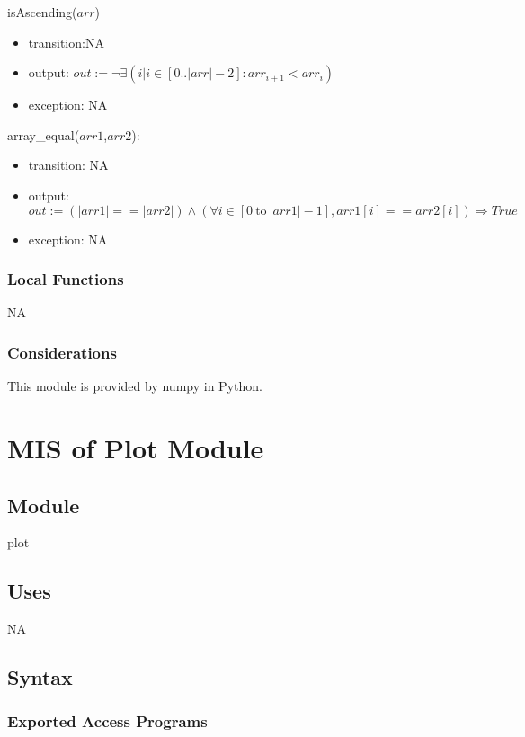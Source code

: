 \documentclass[12pt, titlepage]{article}
\begin{document}
\noindent isAscending($arr$)
\begin{itemize}
	\item transition:NA
	\item output: $out := \neg \exists(i | i \in [0..|arr|-2] : arr_{i+1} < 
	arr_i)$
	\item exception: NA
\end{itemize}



\noindent array\_equal($arr1$,$arr2$):
\begin{itemize}
	\item transition: NA
	\item output: $out := (|arr1| == |arr2|) \land (\forall i \in [0\ 
	\text{to}\ |arr1|-1], arr1[i] == arr2[i]) \Longrightarrow True $
	
	\item exception: NA
\end{itemize}

\subsubsection{Local Functions}

NA

\subsubsection{Considerations}
This module is provided by numpy in Python.


\section{MIS of Plot Module} \label{plot}

\subsection{Module}

plot

\subsection{Uses}

NA

\subsection{Syntax}

\subsubsection{Exported Access Programs}
\end{document}

